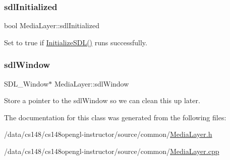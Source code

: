 \subsubsection{\texorpdfstring{sdl\+Initialized}{sdlInitialized}}
{\footnotesize\ttfamily bool Media\+Layer\+::sdl\+Initialized\hspace{0.3cm}{\ttfamily [private]}}



Set to true if \hyperlink{class_media_layer_ad72130dbe963e351d5749a7f48b4ef97}{Initialize\+S\+D\+L()} runs successfully. 

\hypertarget{class_media_layer_a769679df4457ecbe60e9668199e8788b}{}\label{class_media_layer_a769679df4457ecbe60e9668199e8788b} 
\subsubsection{\texorpdfstring{sdl\+Window}{sdlWindow}}
{\footnotesize\ttfamily S\+D\+L\+\_\+\+Window$\ast$ Media\+Layer\+::sdl\+Window\hspace{0.3cm}{\ttfamily [private]}}



Store a pointer to the sdl\+Window so we can clean this up later. 



The documentation for this class was generated from the following files\+:\begin{DoxyCompactItemize}
\item 
/data/cs148/cs148opengl-\/instructor/source/common/\hyperlink{_media_layer_8h}{Media\+Layer.\+h}\item 
/data/cs148/cs148opengl-\/instructor/source/common/\hyperlink{_media_layer_8cpp}{Media\+Layer.\+cpp}\end{DoxyCompactItemize}
